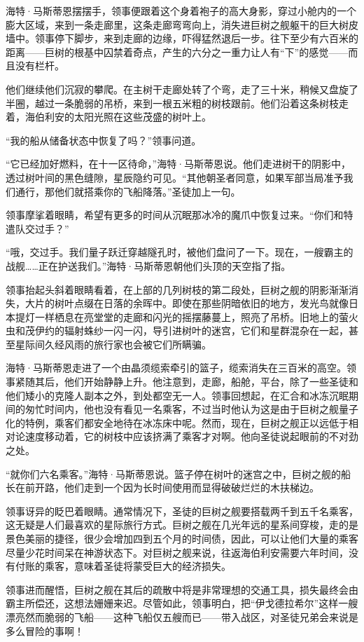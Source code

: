 \documentclass[AutoFakeBold=true]{book}
\begin{document}
海特·马斯蒂恩摆摆手，领事便跟着这个身着袍子的高大身影，穿过小舱内的一个膨大区域，来到一条走廊里，这条走廊弯弯向上，消失进巨树之舰躯干的巨大树皮墙中。领事停下脚步，来到走廊的边缘，吓得猛然退后一步。往下至少有六百米的距离——巨树的根基中囚禁着奇点，产生的六分之一重力让人有``下''的感觉——而且没有栏杆。

他们继续他们沉寂的攀爬。在主树干走廊处转了个弯，走了三十米，稍候又盘旋了半圈，越过一条脆弱的吊桥，来到一根五米粗的树枝跟前。他们沿着这条树枝走着，海伯利安的太阳光照在这些茂盛的树叶上。

``我的船从储备状态中恢复了吗？''领事问道。

``它已经加好燃料，在十一区待命，''海特·马斯蒂恩说。他们走进树干的阴影中，透过树叶间的黑色缝隙，星辰隐约可见。``其他朝圣者同意，如果军部当局准予我们通行，那他们就搭乘你的飞船降落。''圣徒加上一句。

领事摩挲着眼睛，希望有更多的时间从沉眠那冰冷的魔爪中恢复过来。``你们和特遣队交过手？''

``哦，交过手。我们量子跃迁穿越隧孔时，被他们盘问了一下。现在，一艘霸主的战舰……正在护送我们。''海特·马斯蒂恩朝他们头顶的天空指了指。

领事抬起头斜着眼睛看着，在上部的几列树枝的第二段处，巨树之舰的阴影渐渐消失，大片的树叶点缀在日落的余晖中。即使在那些阴暗依旧的地方，发光鸟就像日本提灯一样栖息在亮堂堂的走廊和闪光的摇摆藤蔓上，照亮了吊桥。旧地上的萤火虫和茂伊约的辐射蛛纱一闪一闪，导引进树叶的迷宫，它们和星群混杂在一起，甚至星际间久经风雨的旅行家也会被它们所瞒骗。

海特·马斯蒂恩走进了一个由晶须缆索牵引的篮子，缆索消失在三百米的高空。领事紧随其后，他们开始静静上升。他注意到，走廊，船舱，平台，除了一些圣徒和他们矮小的克隆人副本之外，到处都空无一人。领事回想起，在汇合和冰冻沉眠期间的匆忙时间内，他也没有看见一名乘客，不过当时他认为这是由于巨树之舰量子化的特例，乘客们都安全地待在冰冻床中呢。然而，现在，巨树之舰正以远低于相对论速度移动着，它的树枝中应该挤满了乘客才对啊。他向圣徒说起眼前的不对劲之处。

``就你们六名乘客。''海特·马斯蒂恩说。篮子停在树叶的迷宫之中，巨树之舰的船长在前开路，他们走到一个因为长时间使用而显得破破烂烂的木扶梯边。

领事讶异的眨巴着眼睛。通常情况下，圣徒的巨树之舰要搭载两千到五千名乘客，这无疑是人们最喜欢的星际旅行方式。巨树之舰在几光年远的星系间穿梭，走的是景色美丽的捷径，很少会增加四到五个月的时间债，因此，可以让他们大量的乘客尽量少花时间呆在神游状态下。对巨树之舰来说，往返海伯利安需要六年时间，没有付账的乘客，意味着圣徒将蒙受巨大的经济损失。

领事进而醒悟，巨树之舰在其后的疏散中将是非常理想的交通工具，损失最终会由霸主所偿还，这想法姗姗来迟。尽管如此，领事明白，把``伊戈德拉希尔''这样一艘漂亮然而脆弱的飞船——这种飞船仅五艘而已——带入战区，对圣徒兄弟会来说是多么冒险的事啊！
\end{document}
